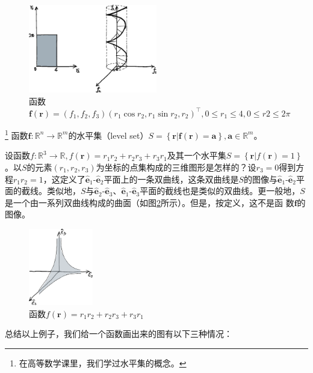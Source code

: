 \documentclass[main.tex]{subfiles}
\begin{document}
\begin{figure}[h]
    \centering
    \includegraphics[width=0.5\textwidth]{images/II.10.4.eps}
    \caption{函数$\mathbf{f}\left(\mathbf{r}\right)=\left(f_1,f_2,f_3\right)\left(r_1\cos r_2, r_1\sin r_2,r_2\right)^\intercal,0\leq r_1\leq 4,0\leq r2\leq 2\pi$}
    \label{fig:II.10.4}
\end{figure}
\begin{definition}[函数的水平集]\footnote{在高等数学课里，我们学过水平集的概念\cite[\S7.1,p~1] {华工高数2009下}。}
函数$\mathbf{f}:\mathbb{R}^n\rightarrow\mathbb{R}^m$的水平集（level set）$S=\left\{\mathbf{r}|\mathbf{f}\left(\mathbf{r}\right)=\mathbf{a}\right\},\mathbf{a}\in\mathbb{R}^m$。
\end{definition}
\begin{example}\label{exp:II.12.8}
设函数$f:\mathbb{R}^3\rightarrow\mathbb{R},f\left(\mathbf{r}\right)=r_1r_2+r_2r_3+r_3r_1$及其一个水平集$S=\left\{\mathbf{r}|f\left(\mathbf{r}\right)=1\right\}$。以$S$的元素$\left(r_1,r_2,r_3\right)$为坐标的点集构成的三维图形是怎样的？设$r_3=0$得到方程$r_1r_2=1$，这定义了$\mathbf{\hat{e}}_1$-$\mathbf{\hat{e}}_2$平面上的一条双曲线，这条双曲线是$S$的图像与$\mathbf{\hat{e}}_1$-$\mathbf{\hat{e}}_2$平面的截线。类似地，$S$与$\mathbf{\hat{e}}_2$-$\mathbf{\hat{e}}_3$、$\mathbf{\hat{e}}_1$-$\mathbf{\hat{e}}_3$平面的截线也是类似的双曲线。更一般地，$S$是一个由一系列双曲线构成的曲面（如图\ref{fig:II.10.5}所示）。但是，按定义，这不是函
数$\mathbf{f}$的图像。
\end{example}
\begin{figure}[h]
    \centering
    \includegraphics[width=0.25\textwidth]{images/II.10.5.eps}
    \caption{函数$f\left(\mathbf{r}\right)=r_1r_2+r_2r_3+r_3r_1$}
    \label{fig:II.10.5}
\end{figure}
总结以上例子，我们给一个函数画出来的图有以下三种情况：
\end{document}
